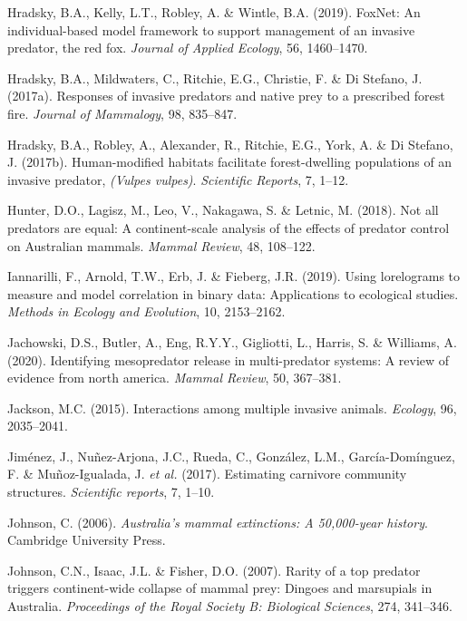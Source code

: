 \documentclass[11pt,a4paper,titlepage,twoside,openright]{style/unimelbthesis}
\begin{document}
\begin{mainmatter}
\leavevmode\hypertarget{ref-hradsky2019foxnet}{}%
Hradsky, B.A., Kelly, L.T., Robley, A. \& Wintle, B.A. (2019). FoxNet: An individual-based model framework to support management of an invasive predator, the red fox. \emph{Journal of Applied Ecology}, 56, 1460--1470.

\leavevmode\hypertarget{ref-hradsky2017responses}{}%
Hradsky, B.A., Mildwaters, C., Ritchie, E.G., Christie, F. \& Di Stefano, J. (2017a). Responses of invasive predators and native prey to a prescribed forest fire. \emph{Journal of Mammalogy}, 98, 835--847.

\leavevmode\hypertarget{ref-hradsky2017human}{}%
Hradsky, B.A., Robley, A., Alexander, R., Ritchie, E.G., York, A. \& Di Stefano, J. (2017b). Human-modified habitats facilitate forest-dwelling populations of an invasive predator, \emph{(Vulpes vulpes)}. \emph{Scientific Reports}, 7, 1--12.

\leavevmode\hypertarget{ref-hunter2018not}{}%
Hunter, D.O., Lagisz, M., Leo, V., Nakagawa, S. \& Letnic, M. (2018). Not all predators are equal: A continent-scale analysis of the effects of predator control on Australian mammals. \emph{Mammal Review}, 48, 108--122.

\leavevmode\hypertarget{ref-iannarilli2019lorelograms}{}%
Iannarilli, F., Arnold, T.W., Erb, J. \& Fieberg, J.R. (2019). Using lorelograms to measure and model correlation in binary data: Applications to ecological studies. \emph{Methods in Ecology and Evolution}, 10, 2153--2162.

\leavevmode\hypertarget{ref-jachowski2020identifying}{}%
Jachowski, D.S., Butler, A., Eng, R.Y.Y., Gigliotti, L., Harris, S. \& Williams, A. (2020). Identifying mesopredator release in multi-predator systems: A review of evidence from north america. \emph{Mammal Review}, 50, 367--381.

\leavevmode\hypertarget{ref-jackson2015interactions}{}%
Jackson, M.C. (2015). Interactions among multiple invasive animals. \emph{Ecology}, 96, 2035--2041.

\leavevmode\hypertarget{ref-jimenez2017estimating}{}%
Jiménez, J., Nuñez-Arjona, J.C., Rueda, C., González, L.M., García-Domínguez, F. \& Muñoz-Igualada, J. \emph{et al.} (2017). Estimating carnivore community structures. \emph{Scientific reports}, 7, 1--10.

\leavevmode\hypertarget{ref-johnson2006australia}{}%
Johnson, C. (2006). \emph{Australia's mammal extinctions: A 50,000-year history}. Cambridge University Press.

\leavevmode\hypertarget{ref-johnson2007rarity}{}%
Johnson, C.N., Isaac, J.L. \& Fisher, D.O. (2007). Rarity of a top predator triggers continent-wide collapse of mammal prey: Dingoes and marsupials in Australia. \emph{Proceedings of the Royal Society B: Biological Sciences}, 274, 341--346.


\end{mainmatter}
\end{document}
